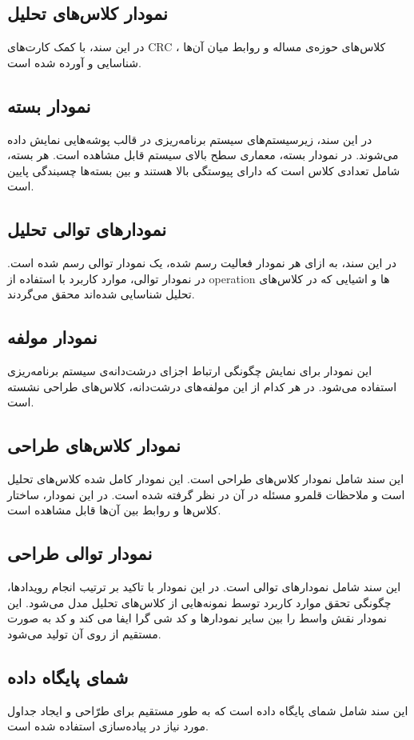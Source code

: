 \subsection{نمودار کلاس‌های تحلیل}
در این سند، با کمک  کارت‌های CRC ، کلاس‌های حوزه‌ی مساله و روابط میان آن‌ها شناسایی و آورده شده است.


\subsection{نمودار بسته}
در این سند، زیرسیستم‌های سیستم برنامه‌ریزی در قالب پوشه‌هایی نمایش داده می‌شوند. در نمودار بسته، معماری سطح بالای سیستم قابل مشاهده است. هر بسته، شامل تعدادی کلاس است که دارای پیوستگی
بالا هستند و بین بسته‌ها چسبندگی
پایین است.

\subsection{نمودارهای توالی تحلیل}
در این سند، به ازای هر نمودار فعالیت رسم شده، یک نمودار توالی رسم شده است. در نمودار توالی، موارد کاربرد با استفاده از operation ها و اشیایی که در کلاس‌های تحلیل شناسایی شده‌اند محقق می‌گردند.

\subsection{ نمودار مولفه}
این نمودار برای نمایش چگونگی ارتباط اجزای درشت‌دانه‌ی سیستم برنامه‌ریزی استفاده می‌شود. در هر کدام از این مولفه‌های درشت‌دانه، کلاس‌های طراحی نشسته است.


\subsection{نمودار کلاس‌های طراحی}
این سند شامل نمودار کلاس‌های طراحی است. این نمودار کامل شده کلاس‌های تحلیل است و ملاحظات قلمرو مسئله در آن در نظر گرفته شده است. در این نمودار، ساختار کلاس‌ها  و روابط بین آن‌ها قابل مشاهده است.
\subsection{نمودار توالی طراحی}
این سند شامل نمودارهای توالی است. در این نمودار با تاکید بر ترتیب انجام رویدادها، چگونگی تحقق موارد کاربرد  توسط نمونه‌هایی از کلاس‌های تحلیل مدل می‌شود. این نمودار نقش واسط را بین سایر نمودارها و کد شی گرا ایفا می کند و کد به صورت مستقیم از روی آن تولید می‌شود.

\subsection{شمای پایگاه داده}
این سند شامل شمای پایگاه داده است که به طور مستقیم برای طرّاحی و ایجاد جداول مورد نیاز در پیاده‌سازی استفاده شده است.


